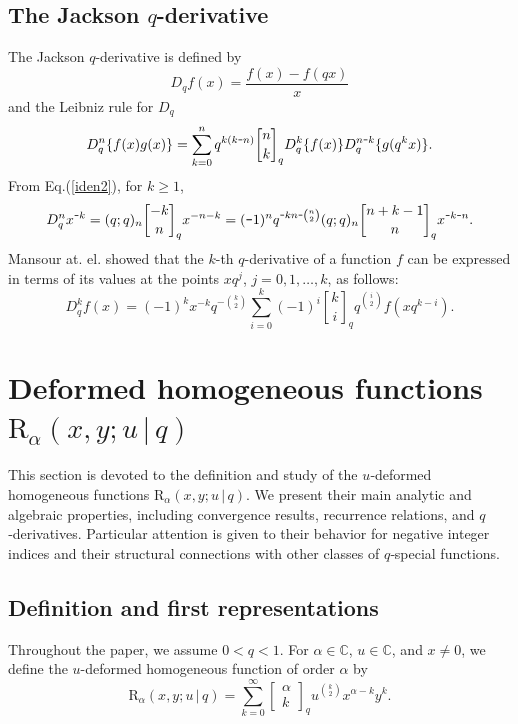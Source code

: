 \documentclass[12pt]{article}
\newcommand{\qbinom}{\genfrac{[}{]}{0pt}{}}
\newcommand{\minus}{\textup{\texttt{-}}}
\newcommand{\rr}{\mathrm{R}}
\begin{document}
\subsection{The Jackson $q$-derivative}

The Jackson \(q\)-derivative is defined by
\begin{equation*}
    D_{q}f(x)=\frac{f(x)-f(qx)}{x}
\end{equation*}
and the Leibniz rule for $D_{q}$
\begin{equation}\label{eqn_leibniz}
    D_{q}^{n}\{f(x)g(x)\}=\sum_{k=0}^{n}q^{k(k\minus n)}\qbinom{n}{k}_{q}D_{q}^{k}\{f(x)\}D_{q}^{n\minus k}\{g(q^{k}x)\}.
\end{equation}
From Eq.(\ref{iden2}), for $k\geq1$,
\begin{equation}
    D_{q}^nx^{\minus k}=(q;q)_{n}\qbinom{-k}{n}_{q}x^{-n-k}=(\minus1)^{n}q^{\minus kn\minus\binom{n}{2}}(q;q)_{n}\qbinom{n+k-1}{n}_{q}x^{\minus k\minus n}.\label{iden9}
\end{equation}
Mansour at. el. \cite{mansour} showed that the \(k\)-th \(q\)-derivative of a function \(f\) can be expressed in terms of its values at the points \(xq^j\), \(j=0,1,\ldots,k\), as follows:
\begin{equation}\label{mansour}
    D_{q}^{k}f(x)=(-1)^kx^{-k}q^{-\binom{k}{2}}\sum_{i=0}^{k}(-1)^i\qbinom{k}{i}_{q}q^{\binom{i}{2}}f(xq^{k-i}).
\end{equation}



\section{Deformed homogeneous functions $\rr_{\alpha}(x,y;u\,|\,q)$}

This section is devoted to the definition and study of the $u$‑deformed homogeneous functions $\rr_{\alpha}(x,y;u\,|\,q)$. We present their main analytic and algebraic properties, including convergence results, recurrence relations, and $q$‑derivatives. Particular attention is given to their behavior for negative integer indices and their structural connections with other classes of $q$‑special functions.

\subsection{Definition and first representations}

Throughout the paper, we assume \(0<q<1\). For \(\alpha\in\mathbb{C}\),
\(u\in\mathbb{C}\), and \(x\neq 0\), we define the \(u\)-deformed
homogeneous function of order \(\alpha\) by
\begin{equation}\label{def_function}
\rr_{\alpha}(x,y;u\,|\,q)
=
\sum_{k=0}^{\infty}
\begin{bmatrix}
\alpha\\ k
\end{bmatrix}_{q}
u^{\binom{k}{2}}
x^{\alpha-k}y^k .
\end{equation}
\end{document}
